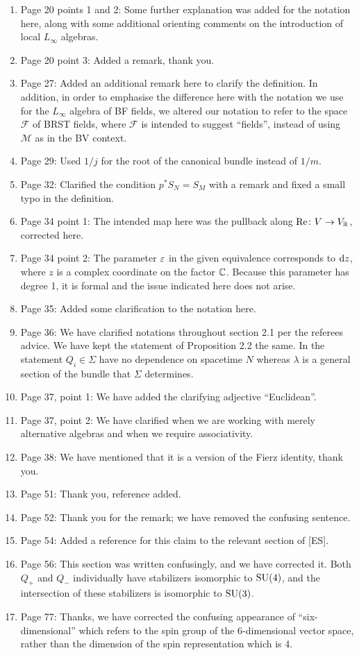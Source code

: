 \documentclass[10pt, oneside]{article}
\begin{document}
\begin{enumerate}
 \item Page 20 points 1 and 2: Some further explanation was added for the notation here, along with some additional orienting comments on the introduction of local $L_\infty$ algebras.
 \item Page 20 point 3: Added a remark, thank you.
 \item Page 27: Added an additional remark here to clarify the definition.  In addition, in order to emphasise the difference here with the notation we use for the $L_\infty$ algebra of BF fields, we altered our notation to refer to the space $\mathcal F$ of BRST fields, where $\mathcal F$ is intended to suggest ``fields'', instead of using $\mathcal M$ as in the BV context. \item Page 29: Used $1/j$ for the root of the canonical bundle instead of $1/m$.
 \item Page 32: Clarified the condition $p^*S_N = S_M$ with a remark and fixed a small typo in the definition.
 \item Page 34 point 1: The intended map here was the pullback along $\mathrm{Re} \colon V \to V_\mathbb R$, corrected here.
 \item Page 34 point 2: The parameter $\varepsilon$ in the given equivalence corresponds to ${\rm d} z$, where $z$ is a complex coordinate on the factor $\mathbb C$.  Because this parameter has degree 1, it is formal and the issue indicated here does not arise.
 \item Page 35: Added some clarification to the notation here.
 \item Page 36: We have clarified notations throughout section 2.1 per the referees advice. 
 We have kept the statement of Proposition 2.2 the same. In the statement $Q_i \in \Sigma$ have no dependence on spacetime $N$ whereas $\lambda$ is a general section of the bundle that $\Sigma$ determines.
 \item Page 37, point 1: We have added the clarifying adjective ``Euclidean''.
 \item Page 37, point 2: We have clarified when we are working with merely alternative algebras and when we require associativity.
 \item Page 38: We have mentioned that it is a version of the Fierz identity, thank you.
 \item Page 51: Thank you, reference added.
 \item Page 52: Thank you for the remark; we have removed the confusing sentence.
 \item Page 54: Added a reference for this claim to the relevant section of [ES].
 \item Page 56: This section was written confusingly, and we have corrected it.  Both $Q_+$ and $Q_-$ individually have stabilizers isomorphic to $\mathrm{SU}(4)$, and the intersection of these stabilizers is isomorphic to $\mathrm{SU}(3)$.
 \item Page 77: Thanks, we have corrected the confusing appearance of ``six-dimensional'' which refers to the spin group of the 6-dimensional vector space, rather than the dimension of the spin representation which is 4.
\end{enumerate}

 
\end{document}
